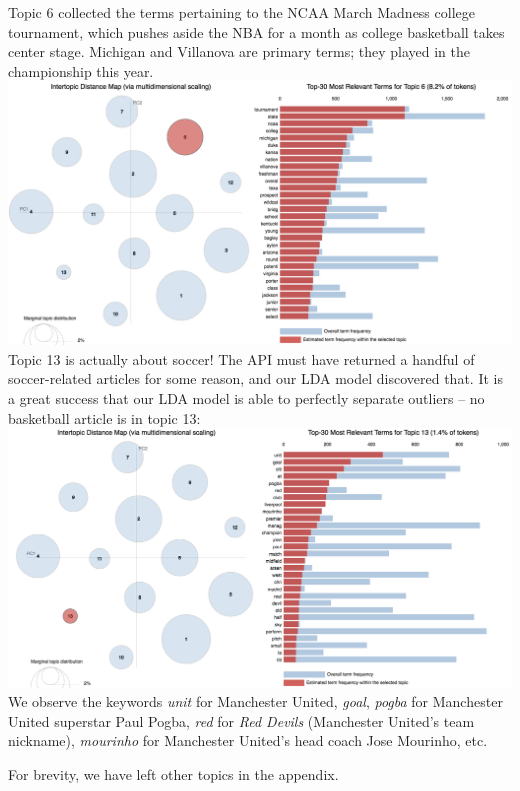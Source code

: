 \documentclass[11pt]{article}
\begin{document}
Topic 6 collected the terms pertaining to the NCAA March Madness college tournament, which pushes aside the NBA for a month as college basketball takes center stage.  Michigan and Villanova are primary terms; they played in the championship this year. \\

\includegraphics[width=470pt]{6.png} \\

Topic 13 is actually about soccer!  The API must have returned a handful of 
soccer-related articles for some reason, and our LDA model discovered that.
It is a great success that our LDA model is able to perfectly separate outliers --
no basketball article is in topic 13:\\
\includegraphics[width=470pt]{13.png} \\

We observe the keywords \emph{unit} for Manchester United, \emph{goal},
\emph{pogba} for Manchester United superstar Paul Pogba, \emph{red} for \emph{Red Devils}
(Manchester United's team nickname), \emph{mourinho} for Manchester United's head coach
Jose Mourinho, etc.

For brevity, we have left other topics in the appendix.
\end{document}
